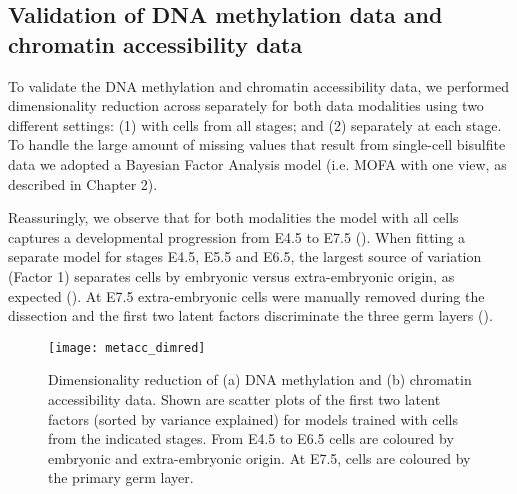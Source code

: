 \subsection{Validation of DNA methylation data and chromatin accessibility data}

To validate the DNA methylation and chromatin accessibility data, we performed dimensionality reduction across separately for both data modalities using two different settings: (1) with cells from all stages; and (2) separately at each stage. To handle the large amount of missing values that result from single-cell bisulfite data we adopted a Bayesian Factor Analysis model (i.e. MOFA with one view, as described in Chapter 2). 


Reassuringly, we observe that for both modalities the model with all cells captures a developmental progression from E4.5 to E7.5 (). When fitting a separate model for stages E4.5, E5.5 and E6.5, the largest source of variation (Factor 1) separates cells by embryonic versus extra-embryonic origin, as expected (). At E7.5 extra-embryonic cells were manually removed during the dissection and the first two latent factors discriminate the three germ layers ().

\begin{figure}[H]
	\centering
	\texttt{[image: metacc\_dimred]}
	\caption[]{
 	Dimensionality reduction of (a) DNA methylation and (b) chromatin accessibility data. Shown are scatter plots of the first two latent factors (sorted by variance explained) for models trained with cells from the indicated stages. From E4.5 to E6.5 cells are coloured by embryonic and extra-embryonic origin. At E7.5, cells are coloured by the primary germ layer. 
	}
	\label{fig:metacc_dimred}
\end{figure}

